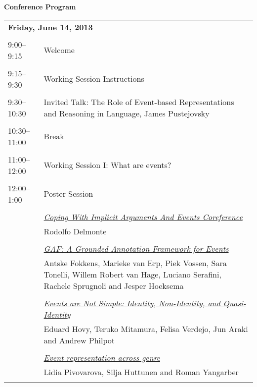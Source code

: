 \setlength{\parindent}{0in}
\setlength{\parskip}{2ex}
\renewcommand{\baselinestretch}{0.87}

\begin{center}
{\Large \bf
  Conference Program
}
\end{center}
\vspace{3mm}
\begin{tabular}{p{20mm}p{128mm}}
\multicolumn{2}{l}{\bf Friday, June 14, 2013} \\
\\
9:00--9:15 & Welcome \\
\\
9:15--9:30 & Working Session Instructions \\
\\
9:30--10:30 & Invited Talk: The Role of Event-based Representations and Reasoning in Language, James Pustejovsky \\
\\
10:30--11:00 & Break \\
\\
11:00--12:00 & Working Session I: What are events? \\
\\
12:00--1:00 & Poster Session \\
\\
 & \hyperlink{page.1}{\em Coping With Implicit Arguments And Events Coreference}\\
         & Rodolfo Delmonte \\
\\

 & \hyperlink{page.11}{\em GAF: A Grounded Annotation Framework for Events}\\
         & Antske Fokkens, Marieke van Erp, Piek Vossen, Sara Tonelli, Willem Robert van Hage, Luciano Serafini, Rachele Sprugnoli and Jesper Hoeksema \\
\\

 & \hyperlink{page.21}{\em Events are Not Simple: Identity, Non-Identity, and Quasi-Identity}\\
         & Eduard Hovy, Teruko Mitamura, Felisa Verdejo, Jun Araki and Andrew Philpot \\
\\

 & \hyperlink{page.29}{\em Event representation across genre}\\
         & Lidia Pivovarova, Silja Huttunen and Roman Yangarber \\
\\


\end{tabular}
